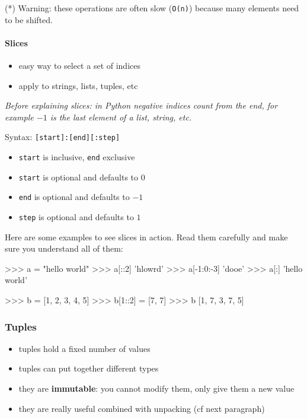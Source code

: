 \documentclass[twocolumn]{article}
\let\oldparagraph\paragraph
\renewcommand{\paragraph}[1]{\oldparagraph{#1}\mbox{}}
\begin{document}
(*) Warning: these operations are often slow (\texttt{O(n)}) because many elements need to be shifted.

\paragraph{Slices}\label{slices}

\begin{itemize}
\item easy way to select a set of indices
\item apply to strings, lists, tuples, etc
\end{itemize}

\textit{Before explaining slices: in Python negative indices count from the end, for example $-1$ is the last element of a list, string, etc.}

Syntax: \texttt{[start]:[end][:step]}
\begin{itemize}
\item \texttt{start} is inclusive, \texttt{end} exclusive
\item \texttt{start} is optional and defaults to $0$
\item \texttt{end} is optional and defaults to $-1$
\item \texttt{step} is optional and defaults to $1$
\end{itemize}

\newpage

Here are some examples to see slices in action. Read them carefully and make sure you understand all of them:

\begin{python}
>>> a = "hello world"
>>> a[::2]
'hlowrd'
>>> a[-1:0:-3]
'dooe'
>>> a[:]
'hello world'
\end{python}

\begin{python}
>>> b = [1, 2, 3, 4, 5]
>>> b[1::2] = [7, 7]
>>> b
[1, 7, 3, 7, 5]
\end{python}

\subsubsection{Tuples}\label{tuples}

\begin{itemize}
\item tuples hold a fixed number of values
\item tuples can put together different types
\item they are \textbf{immutable}: you cannot modify them, only give them a new value
\item they are really useful combined with unpacking (cf next paragraph)
\end{itemize}
\end{document}
